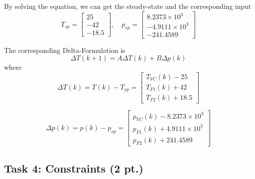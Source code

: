 \documentclass[a4paper,twoside,11pt]{article}
\numberwithin{equation}{section}
\begin{document}
By solving the equation, we can get the steady-state and the corresponding input
\begin{equation*}
    T_{sp} = 
    \begin{bmatrix}
    25 \\
    -42 \\
    -18.5
    \end{bmatrix}
    , \quad
    p_{sp} = 
    \begin{bmatrix}
    8.2373\times10^{3} \\
    -4.9111\times10^{3} \\
    -241.4589
    \end{bmatrix}
\end{equation*}

The corresponding Delta-Formulation is 
\begin{equation}
    \Delta T(k+1) = A \Delta T(k) + B \Delta p(k)
\end{equation}
where
\begin{equation*}
    \Delta T(k) = T(k) - T_{sp} = 
    \begin{bmatrix}
    T_{VC}(k) - 25\\
    T_{F1}(k) + 42\\
    T_{F2}(k) + 18.5
    \end{bmatrix}
\end{equation*}

\begin{equation*}
    \Delta p(k) = p(k) - p_{sp} = 
    \begin{bmatrix}
    p_{VC}(k) - 8.2373\times10^{3}\\
    p_{F1}(k) + 4.9111\times10^{3}\\
    p_{F2}(k) + 241.4589
    \end{bmatrix}
\end{equation*}

\subsection{Task 4: Constraints (2 pt.)}
\end{document}
